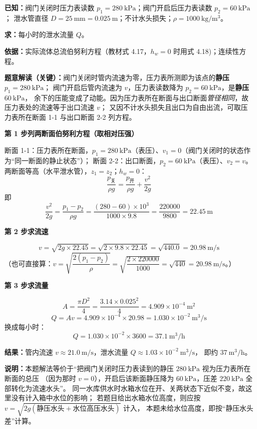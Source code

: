 \begin{jie}
\textbf{已知：}阀门关闭时压力表读数 $p_1=280\ \mathrm{kPa}$；阀门开启后压力表读数 $p_2=60\ \mathrm{kPa}$；
泄水管直径 $D=25\ \mathrm{mm}=0.025\ \mathrm{m}$；不计水头损失；$\rho=1000\ \mathrm{kg/m^3}$。

\textbf{求：}每小时的泄水流量 $Q$。

\textbf{依据：}实际流体总流伯努利方程（教材式 4.17，$h_w=0$ 时用式 4.18)；连续性方程。

\textbf{题意解读（关键）：}阀门关闭时管内流速为零，压力表所测即为该点的\textbf{静压} $p_1=280\ \mathrm{kPa}$；
阀门开启后管内流速为 $v$，压力表读数降为 $p_2=60\ \mathrm{kPa}$，是\textbf{静压} $60\ \mathrm{kPa}$，
余下的压能变成了动能。因为压力表所在断面与出口断面\emph{管径相同}，故压力表处的流速等于出口流速 $v$；
又因不计水头损失且出口为自由出流，可取压力表所在断面 1-1 与出口断面 2-2 列方程。

\textbf{第 1 步\quad 列两断面伯努利方程（取相对压强）}

断面 1-1：压力表所在断面，$p_1=280\ \mathrm{kPa}$（表压）、$v_1=0$（阀门关闭时的状态作为“同一断面的静止状态”）；
断面 2-2：出口断面，$p_2=60\ \mathrm{kPa}$（表压）、$v_2=v$。
两断面等高（水平泄水管），$z_1=z_2$；$h_w=0$：
\[ \frac{p_{\text{关}}}{\rho g}=\frac{p_{\text{开}}}{\rho g}+\frac{v^2}{2g} \]
即
\[ \frac{v^2}{2g}=\frac{p_1-p_2}{\rho g}=\frac{(280-60)\times10^3}{1000\times9.8}=\frac{220000}{9800}=22.45\ \mathrm{m} \]

\textbf{第 2 步\quad 求流速}

\[ v=\sqrt{2g\times22.45}=\sqrt{2\times9.8\times22.45}=\sqrt{440.0}=20.98\ \mathrm{m/s} \]
（也可直接算：$v=\sqrt{\dfrac{2(p_1-p_2)}{\rho}}=\sqrt{\dfrac{2\times220000}{1000}}=\sqrt{440}=20.98\ \mathrm{m/s}$。）

\textbf{第 3 步\quad 求流量}

\[ A=\frac{\pi D^2}{4}=\frac{3.14\times0.025^2}{4}=4.909\times10^{-4}\ \mathrm{m^2} \]
\[ Q=Av=4.909\times10^{-4}\times20.98=1.030\times10^{-2}\ \mathrm{m^3/s} \]
换成每小时：
\[ Q=1.030\times10^{-2}\times3600=37.1\ \mathrm{m^3/h} \]

\textbf{结果：}管内流速 $v\approx21.0\ \mathrm{m/s}$，泄水流量 $Q\approx1.03\times10^{-2}\ \mathrm{m^3/s}$，
即约 $37\ \mathrm{m^3/h}$。

\textbf{说明：}本题解法等价于“把阀门关闭时压力表读到的静压 $280\ \mathrm{kPa}$ 视为压力表所在断面的总压
（因为那时 $v=0$），开启后该断面静压降为 $60\ \mathrm{kPa}$，压差 $220\ \mathrm{kPa}$ 全部转化为流速水头”。
同一水库供水时水箱水位在开、关两状态下近似不变，故这里没有计入箱中水位的影响；
若题目给出水箱水位高度，则应按 $v=\sqrt{2g(\text{静压水头}+\text{水位高压水头})}$ 计入，
本题未给水位高度，即按“静压水头差”计算。
\end{jie}

